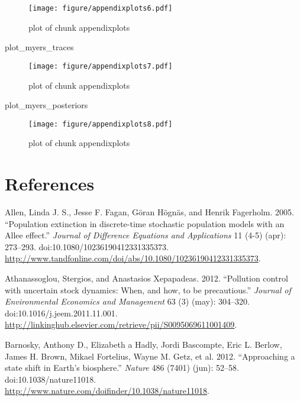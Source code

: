 \documentclass[author-year, review]{elsarticle} %
\makeatletter
\newenvironment{Shaded}{}{}
\newcommand{\NormalTok}[1]{{#1}}
\def\maxwidth{\ifdim\Gin@nat@width>\linewidth\linewidth
\else\Gin@nat@width\fi}
\let\Oldincludegraphics\includegraphics
\renewcommand{\includegraphics}[1]{\Oldincludegraphics[width=\maxwidth]{#1}}
\makeatother
\begin{document}
\begin{figure}[htbp]
\centering
\texttt{[image: figure/appendixplots6.pdf]}
\caption{plot of chunk appendixplots}
\end{figure}

\begin{Shaded}
\begin{Highlighting}[]
\NormalTok{plot_myers_traces}
\end{Highlighting}
\end{Shaded}

\begin{figure}[htbp]
\centering
\texttt{[image: figure/appendixplots7.pdf]}
\caption{plot of chunk appendixplots}
\end{figure}

\begin{Shaded}
\begin{Highlighting}[]
\NormalTok{plot_myers_posteriors}
\end{Highlighting}
\end{Shaded}

\begin{figure}[htbp]
\centering
\texttt{[image: figure/appendixplots8.pdf]}
\caption{plot of chunk appendixplots}
\end{figure}

\section{References}

Allen, Linda J. S., Jesse F. Fagan, Göran Högnäs, and Henrik Fagerholm.
2005. ``Population extinction in discrete-time stochastic population
models with an Allee effect.'' \emph{Journal of Difference Equations and
Applications} 11 (4-5) (apr): 273--293.
doi:10.1080/10236190412331335373.
\url{http://www.tandfonline.com/doi/abs/10.1080/10236190412331335373}.

Athanassoglou, Stergios, and Anastasios Xepapadeas. 2012. ``Pollution
control with uncertain stock dynamics: When, and how, to be
precautious.'' \emph{Journal of Environmental Economics and Management}
63 (3) (may): 304--320. doi:10.1016/j.jeem.2011.11.001.
\url{http://linkinghub.elsevier.com/retrieve/pii/S0095069611001409}.

Barnosky, Anthony D., Elizabeth a Hadly, Jordi Bascompte, Eric L.
Berlow, James H. Brown, Mikael Fortelius, Wayne M. Getz, et al. 2012.
``Approaching a state shift in Earth's biosphere.'' \emph{Nature} 486
(7401) (jun): 52--58. doi:10.1038/nature11018.
\url{http://www.nature.com/doifinder/10.1038/nature11018}.
\end{document}
